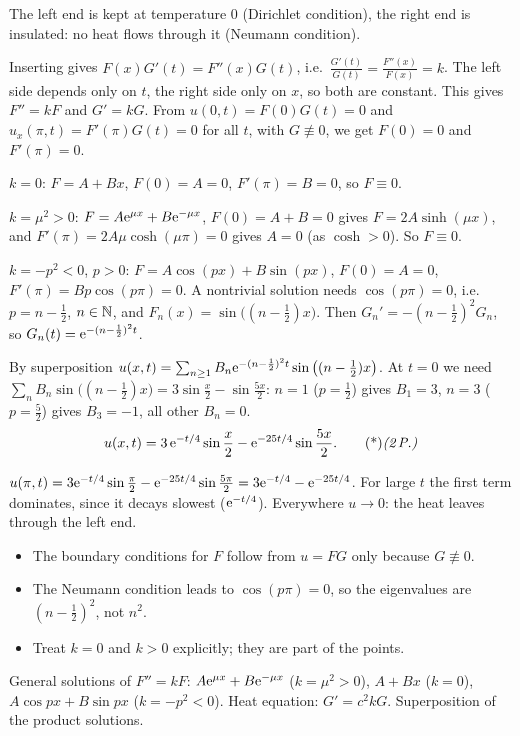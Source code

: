 \begin{solution}
 The left end is kept at temperature $0$ (Dirichlet condition), the right end is insulated: no heat flows through it (Neumann condition). 

 Inserting gives $F(x)G'(t)=F''(x)G(t)$, i.e.\ $\frac{G'(t)}{G(t)}=\frac{F''(x)}{F(x)}=k$. The left side depends only on $t$, the right side only on $x$, so both are constant. 
This gives $F''=kF$ and $G'=kG$. From $u(0,t)=F(0)G(t)=0$ and $u_x(\pi,t)=F'(\pi)G(t)=0$ for all $t$, with $G\not\equiv0$, we get $F(0)=0$ and $F'(\pi)=0$. 

$k=0$: $F=A+Bx$, $F(0)=A=0$, $F'(\pi)=B=0$, so $F\equiv0$. 

$k=\mu^2>0$: $F=A\mathrm{e}^{\mu x}+B\mathrm{e}^{-\mu x}$, $F(0)=A+B=0$ gives $F=2A\sinh(\mu x)$, and $F'(\pi)=2A\mu\cosh(\mu\pi)=0$ gives $A=0$ (as $\cosh>0$). So $F\equiv0$. 

$k=-p^2<0$, $p>0$: $F=A\cos(px)+B\sin(px)$, $F(0)=A=0$, $F'(\pi)=Bp\cos(p\pi)=0$. A nontrivial solution needs $\cos(p\pi)=0$, i.e.\ $p=n-\frac12$, $n\in\mathbb{N}$, and $F_n(x)=\sin\big((n-\frac12)x\big)$. 
Then $G_n'=-(n-\frac12)^2G_n$, so $G_n(t)=\mathrm{e}^{-(n-\frac12)^2t}$. 

 By superposition $u(x,t)=\sum_{n\ge1}B_n\mathrm{e}^{-(n-\frac12)^2t}\sin\big((n-\frac12)x\big)$. At $t=0$ we need $\sum_nB_n\sin\big((n-\frac12)x\big)=3\sin\frac x2-\sin\frac{5x}2$: $n=1$ ($p=\frac12$) gives $B_1=3$, $n=3$ ($p=\frac52$) gives $B_3=-1$, all other $B_n=0$. 
\[
u(x,t)=3\,\e^{-t/4}\sin\frac x2-\e^{-25t/4}\sin\frac{5x}2.\ptd{2}
\]

 $u(\pi,t)=3\mathrm{e}^{-t/4}\sin\frac\pi2-\mathrm{e}^{-25t/4}\sin\frac{5\pi}2=3\mathrm{e}^{-t/4}-\mathrm{e}^{-25t/4}$. 
For large $t$ the first term dominates, since it decays slowest ($\mathrm{e}^{-t/4}$). Everywhere $u\to0$: the heat leaves through the left end. 

\begin{trap}
\begin{itemize}
\item The boundary conditions for $F$ follow from $u=FG$ only because $G\not\equiv0$.
\item The Neumann condition leads to $\cos(p\pi)=0$, so the eigenvalues are $(n-\frac12)^2$, not $n^2$.
\item Treat $k=0$ and $k>0$ explicitly; they are part of the points.
\end{itemize}
\end{trap}
\begin{heart}
General solutions of $F''=kF$: $A\mathrm{e}^{\mu x}+B\mathrm{e}^{-\mu x}$ ($k=\mu^2>0$), $A+Bx$ ($k=0$), $A\cos px+B\sin px$ ($k=-p^2<0$). Heat equation: $G'=c^2kG$. Superposition of the product solutions.
\end{heart}
\end{solution}

